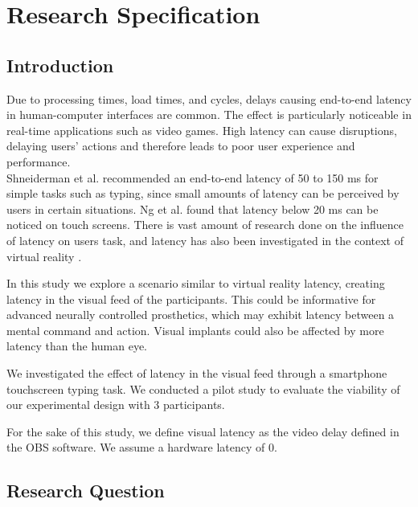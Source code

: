 \section{Research Specification}


\subsection{Introduction}

Due to processing times, load times, and cycles, delays causing end-to-end latency in human-computer interfaces are common. The effect is particularly noticeable in real-time applications such as video games. High latency can cause disruptions, delaying users' actions and therefore leads to poor user experience and performance.
\\
Shneiderman et al. \cite{Shneiderman2016-ln} recommended an end-to-end latency of 50 to 150 ms for simple tasks such as typing, since small amounts of latency can be perceived by users in certain situations. Ng et al. \cite{Ng2012-ns} found that latency below 20 ms can be noticed on touch screens. There is vast amount of research done on the influence of latency on users task, and latency has also been investigated in the context of virtual reality \cite{stauffert2020latency}. 

In this study we explore a scenario similar to virtual reality latency, creating latency in the visual feed of the participants. This could be informative for advanced neurally controlled prosthetics, which may exhibit latency between a mental command and action. Visual implants could also be affected by more latency than the human eye. 

We investigated the effect of latency in the visual feed through a smartphone touchscreen typing task. We conducted a pilot study to evaluate the viability of our experimental design with 3 participants.

For the sake of this study, we define visual latency as the video delay defined in the OBS software. We assume a hardware latency of 0. 

\subsection{Research Question}

